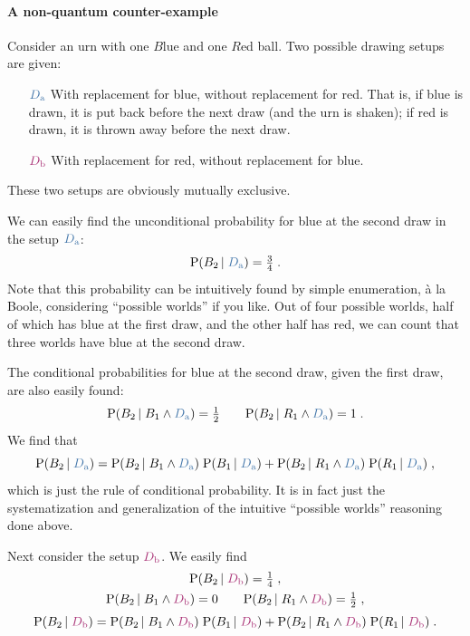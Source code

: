 \documentclass[\ifafour a4paper,12pt,\else a5paper,10pt,\fi%
onecolumn,oneside,article,%
british%
]{memoir}
\theoremstyle{remark}
\theoremstyle{innote}
\newcommand*{\p}{\mathrm{P}}%
\renewcommand*{\|}[1][]{\nonscript\,#1\vert\nonscript\;\mathopen{}}
\newcommand*{\yDa}{\textcolor{mypurpleblue}{D_{\textrm{a}}}}
\newcommand*{\yDb}{\textcolor{myredpurple}{D_{\textrm{b}}}}
\begin{document}
\bigskip

\paragraph{A non-quantum counter-example}

Consider an urn with one $B$lue and one $R$ed ball. Two possible
drawing setups are given:
\begin{enumerate}%
\item[$\yDa$]\label{item:repB} With replacement for blue, without replacement for
  red. That is, if blue is drawn, it is put back before the next draw (and
  the urn is shaken); if red is drawn, it is thrown away before the next
  draw.
\item[$\yDb$]\label{item:repR} With replacement for red, without replacement for
  blue.
\end{enumerate}
These two setups are obviously mutually exclusive.

We can easily find the unconditional probability for blue at the
second draw in the setup $\yDa$:
\begin{equation}
  \label{eq:A_red2}
  \p(B_{2} \| \yDa) = \tfrac{3}{4} \;.
\end{equation}
Note that this probability can be intuitively found by simple enumeration,
\`a la Boole, considering \enquote{possible worlds} if you like. Out of
four possible worlds, half of which has blue at the first draw, and the
other half has red, we can count that three worlds have blue at the second
draw.

The conditional probabilities for blue at the second draw,
given the first draw, are also easily found:
\begin{equation}
  \label{eq:A_red2cond}
  \p(B_{2} \| B_{1} \land \yDa) = \tfrac{1}{2} \qquad
  \p(B_{2} \| R_{1} \land \yDa) = 1 \;.
\end{equation}
We find that
\begin{equation}
  \label{eq:A_rule}
  \p(B_{2} \| \yDa) =%
  \p(B_{2} \| B_{1} \land \yDa) \; \p( B_{1} \| \yDa) +
  \p(B_{2} \| R_{1} \land \yDa)  \; \p( R_{1} \| \yDa) \;,
\end{equation}
which is just the rule of conditional probability. It is in fact just the
systematization and generalization of the intuitive \enquote{possible
  worlds} reasoning done above.

\medskip

Next consider the setup $\yDb$. We easily find
\begin{gather}
  \label{eq:B_red2}
  \p(B_{2} \| \yDb) = \tfrac{1}{4} \;,
  \\
  \label{eq:B_red2cond}
  \p(B_{2} \| B_{1} \land \yDb) = 0 \qquad
  \p(B_{2} \| R_{1} \land \yDb) = \tfrac{1}{2} \;,
  \\[\jot]
  \label{eq:B_rule}
  \p(B_{2} \| \yDb) =%
  \p(B_{2} \| B_{1} \land \yDb) \; \p( B_{1} \| \yDb) +
  \p(B_{2} \| R_{1} \land \yDb)  \; \p( R_{1} \| \yDb) \;.
\end{gather}
\end{document}
